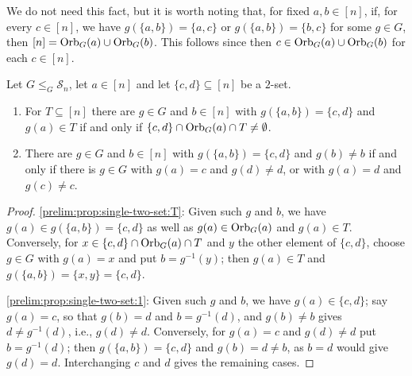 \begin{remark}
	We do not need this fact, but it is worth noting
	that, for fixed $a,b \in [n]$,
	if, for every $c \in [n]$,
	we have  $g(\{a,b\}) = \{a,c\}$ or $g(\{a,b\}) = \{b,c\}$ 
	for some $g \in G$, 
	then $[n] = \Orbit{a}{G} \cup \Orbit{b}{G}$.
	This follows since then  $c \in \Orbit{a}{G} \cup \Orbit{b}{G}$ for 
	each $c \in [n]$.
\end{remark}

\begin{proposition} \label{prelim:prop:single-two-set}
	Let $G \le_G \mathcal S_n$, let $a \in [n]$ and let $\{c,d\} \subseteq [n]$ be a $2$-set.
	\begin{enumerate}
		\item \label{prelim:prop:single-two-set:T} For $T \subseteq [n]$ there are $g \in G$ and
		$b \in [n]$ with $g(\{a,b\}) = \{c,d\}$ and $g(a) \in T$ if and only if
		$\{c,d\} \cap \Orbit{a}{G} \cap T \ne \emptyset$.
		
		\item \label{prelim:prop:single-two-set:1} There are $g \in G$ and $b \in [n]$ with
		$g(\{a,b\}) = \{c,d\}$ and $g(b) \ne b$ if and only if there is $g \in G$ with $g(a) = c$
		and $g(d) \ne d$, or with $g(a) = d$ and $g(c) \ne c$.
	\end{enumerate}
\end{proposition}
\begin{proof}
	\ref{prelim:prop:single-two-set:T}: Given such $g$ and $b$, we have
	$g(a) \in g(\{a,b\}) = \{c,d\}$ as well as $g(a) \in \Orbit{a}{G}$ and $g(a) \in T$.
	Conversely, for $x \in \{c,d\} \cap \Orbit{a}{G} \cap T$ and $y$ the other element of
	$\{c,d\}$, choose $g \in G$ with $g(a) = x$ and put $b = g^{-1}(y)$;
	then $g(a) \in T$ and $g(\{a,b\}) = \{x,y\} = \{c,d\}$.
	
	\ref{prelim:prop:single-two-set:1}: Given such $g$ and $b$, we have $g(a) \in \{c,d\}$;
	say $g(a) = c$, so that $g(b) = d$ and $b = g^{-1}(d)$, and $g(b) \ne b$ gives
	$d \ne g^{-1}(d)$, i.e., $g(d) \ne d$.
	Conversely, for $g(a) = c$ and $g(d) \ne d$ put $b = g^{-1}(d)$;
	then $g(\{a,b\}) = \{c,d\}$ and $g(b) = d \ne b$, as $b = d$ would give $g(d) = d$.
	Interchanging $c$ and $d$ gives the remaining cases.
\end{proof}

